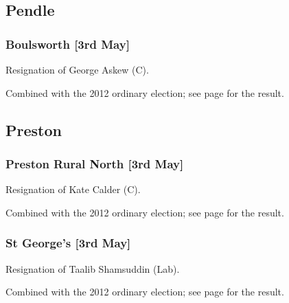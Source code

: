 \documentclass[a4paper,openany]{book}
\begin{document}
\begin{resultsiii}
\subsection*{Pendle}

\subsubsection*{Boulsworth \hspace*{\fill}\nolinebreak[1]%
\enspace\hspace*{\fill}
[3rd May]}


Resignation of George Askew (C).

Combined with the 2012 ordinary election; see page \pageref{BoulsworthPendle} for the result.

\subsection*{Preston}

\subsubsection*{Preston Rural North \hspace*{\fill}\nolinebreak[1]%
\enspace\hspace*{\fill}
[3rd May]}


Resignation of Kate Calder (C).

Combined with the 2012 ordinary election; see page \pageref{PrestonRuralNorthPreston} for the result.

\subsubsection*{St George's \hspace*{\fill}\nolinebreak[1]%
\enspace\hspace*{\fill}
[3rd May]}


Resignation of Taalib Shamsuddin (Lab).

Combined with the 2012 ordinary election; see page \pageref{SaintGeorgesPreston} for the result.


\end{resultsiii}
\end{document}
